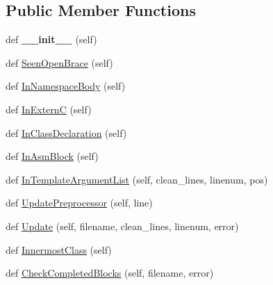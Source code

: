 \subsection*{Public Member Functions}
\begin{DoxyCompactItemize}
\item 
def {\bfseries \+\_\+\+\_\+init\+\_\+\+\_\+} (self)\hypertarget{classcpplint_1_1NestingState_a47e1ad559b9c7304f53d19ef6ebedab4}{}\label{classcpplint_1_1NestingState_a47e1ad559b9c7304f53d19ef6ebedab4}

\item 
def \hyperlink{classcpplint_1_1NestingState_a15abc0719a22ca8fbb7a8235f0e22b3e}{Seen\+Open\+Brace} (self)
\item 
def \hyperlink{classcpplint_1_1NestingState_a1a06f50d53cfe11b1f78d45b531e0c32}{In\+Namespace\+Body} (self)
\item 
def \hyperlink{classcpplint_1_1NestingState_a67aa1907d42b8408c227ff18537071c7}{In\+ExternC} (self)
\item 
def \hyperlink{classcpplint_1_1NestingState_a8e111c25149c41bd8927606244965b3c}{In\+Class\+Declaration} (self)
\item 
def \hyperlink{classcpplint_1_1NestingState_aa35a529052e4863a477eae649ce778d2}{In\+Asm\+Block} (self)
\item 
def \hyperlink{classcpplint_1_1NestingState_a8f4e9ba1aaa0459de2bedd966e7a2b54}{In\+Template\+Argument\+List} (self, clean\+\_\+lines, linenum, pos)
\item 
def \hyperlink{classcpplint_1_1NestingState_ac3d509c536af445e8ab6b17b067b53f1}{Update\+Preprocessor} (self, line)
\item 
def \hyperlink{classcpplint_1_1NestingState_a3adead8c1575b98ace5c5230f3772c1e}{Update} (self, filename, clean\+\_\+lines, linenum, error)
\item 
def \hyperlink{classcpplint_1_1NestingState_a4141768e75b16698463670caaa587120}{Innermost\+Class} (self)
\item 
def \hyperlink{classcpplint_1_1NestingState_a7bde5ab65152b4073763b1bd17cba567}{Check\+Completed\+Blocks} (self, filename, error)
\end{DoxyCompactItemize}
